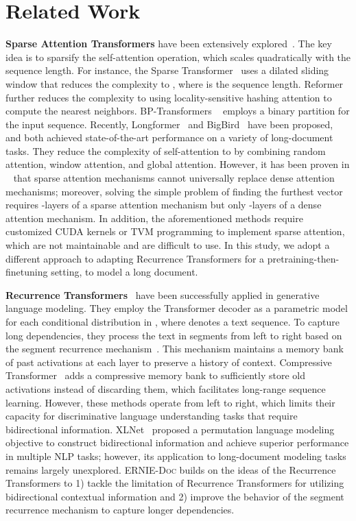 \documentclass[11pt,a4paper]{article}
\newcommand{\mname}{\textsc{ERNIE-Doc}\xspace}
\begin{document}
\section{Related Work}\label{sec:related-work}
\noindent\textbf{Sparse Attention Transformers} have been extensively explored~\citep{sparse_transformer,tay2020sparse,beltagy2020longformer,zaheer2020big}. The key idea is to sparsify the self-attention operation, which scales quadratically with the sequence length. For instance, the Sparse Transformer~\citep{sparse_transformer} uses a dilated sliding window that reduces the complexity to , where  is the sequence length. Reformer~\citep{kitaev2020reformer} further reduces the complexity to  using locality-sensitive hashing attention to compute the nearest neighbors. BP-Transformers ~\citep{ye2019bp} employs a binary partition for the input sequence. Recently, Longformer~\citep{beltagy2020longformer} and BigBird~\citep{zaheer2020big} have been proposed, and both achieved state-of-the-art performance on a variety of long-document tasks. They reduce the complexity of self-attention to  by combining random attention, window attention, and global attention. However, it has been proven in ~\citet{zaheer2020big} that sparse attention mechanisms cannot universally replace dense attention mechanisms; moreover, solving the simple problem of finding the furthest vector requires -layers of a sparse attention mechanism but only -layers of a dense attention mechanism. In addition, the aforementioned methods require customized CUDA kernels or TVM programming to implement sparse attention, which are not maintainable and are difficult to use. In this study, we adopt a different approach to adapting Recurrence Transformers for a pretraining-then-finetuning setting, to model a long document.  

\noindent\textbf{Recurrence Transformers}~\citep{transformer_xl, compressive_transformer} have been successfully applied in generative language modeling. They employ the Transformer decoder as a parametric model for each conditional distribution in , where  denotes a text sequence. To capture long dependencies, they process the text in segments from left to right based on the segment recurrence mechanism~\citep{transformer_xl}. This mechanism maintains a memory bank of past activations at each layer to preserve a history of context. Compressive Transformer~\citep{compressive_transformer} adds a compressive memory bank to sufficiently store old activations instead of discarding them, which facilitates long-range sequence learning. However, these methods operate from left to right, which limits their capacity for discriminative language understanding tasks that require bidirectional information. XLNet~\citep{yang2019xlnet} proposed a permutation language modeling objective to construct bidirectional information and achieve superior performance in multiple NLP tasks; however, its application to long-document modeling tasks remains largely unexplored. \mname builds on the ideas of the Recurrence Transformers to 1) tackle the limitation of Recurrence Transformers for utilizing bidirectional contextual information and 2) improve the behavior of the segment recurrence mechanism to capture longer dependencies.
\end{document}
